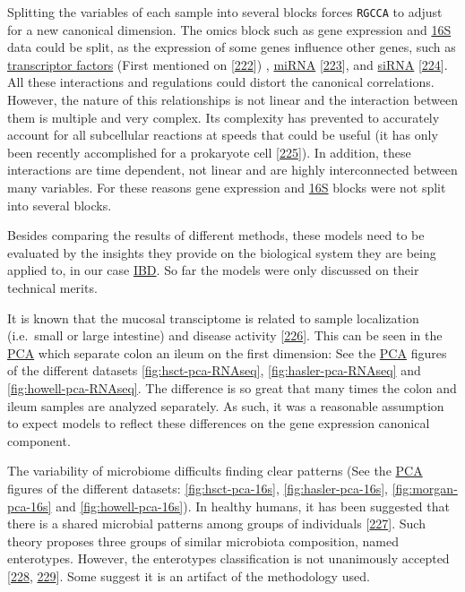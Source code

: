 \documentclass[
  12pt,
  a4paper,
  twoside,
  openright]{book}
\begin{document}
Splitting the variables of each sample into several blocks forces \texttt{RGCCA} to adjust for a new canonical dimension.
The omics block such as gene expression and \protect\hyperlink{acronyms_16S}{16S} data could be split, as the expression of some genes influence other genes, such as \href{https://en.wikipedia.org/wiki/Transcription_factor}{transcriptor factors} (First mentioned on {[}\protect\hyperlink{ref-stillman1984}{222}{]}) , \href{https://en.wikipedia.org/wiki/MicroRNA}{miRNA} {[}\protect\hyperlink{ref-lee1993}{223}{]}, and \href{https://en.wikipedia.org/wiki/Small_interfering_RNA}{siRNA} {[}\protect\hyperlink{ref-hamilton1999}{224}{]}.
All these interactions and regulations could distort the canonical correlations.
However, the nature of this relationships is not linear and the interaction between them is multiple and very complex.
Its complexity has prevented to accurately account for all subcellular reactions at speeds that could be useful (it has only been recently accomplished for a prokaryote cell {[}\protect\hyperlink{ref-thornburg2022}{225}{]}).
In addition, these interactions are time dependent, not linear and are highly interconnected between many variables.
For these reasons gene expression and \protect\hyperlink{acronyms_16S}{16S} blocks were not split into several blocks.

Besides comparing the results of different methods, these models need to be evaluated by the insights they provide on the biological system they are being applied to, in our case \protect\hyperlink{acronyms_IBD}{IBD}.
So far the models were only discussed on their technical merits.

It is known that the mucosal transciptome is related to sample localization (i.e.~small or large intestine) and disease activity {[}\protect\hyperlink{ref-criss2021}{226}{]}.
This can be seen in the \protect\hyperlink{acronyms_PCA}{PCA} which separate colon an ileum on the first dimension: See the \protect\hyperlink{acronyms_PCA}{PCA} figures of the different datasets \ref{fig:hsct-pca-RNAseq}, \ref{fig:hasler-pca-RNAseq} and \ref{fig:howell-pca-RNAseq}.
The difference is so great that many times the colon and ileum samples are analyzed separately.
As such, it was a reasonable assumption to expect models to reflect these differences on the gene expression canonical component.

The variability of microbiome difficults finding clear patterns (See the \protect\hyperlink{acronyms_PCA}{PCA} figures of the different datasets: \ref{fig:hsct-pca-16s}, \ref{fig:hasler-pca-16s}, \ref{fig:morgan-pca-16s} and \ref{fig:howell-pca-16s}).
In healthy humans, it has been suggested that there is a shared microbial patterns among groups of individuals {[}\protect\hyperlink{ref-arumugam2011}{227}{]}. Such theory proposes three groups of similar microbiota composition, named enterotypes. However, the enterotypes classification is not unanimously accepted {[}\protect\hyperlink{ref-koren2013}{228}, \protect\hyperlink{ref-cheng2019}{229}{]}.
Some suggest it is an artifact of the methodology used.
\end{document}
